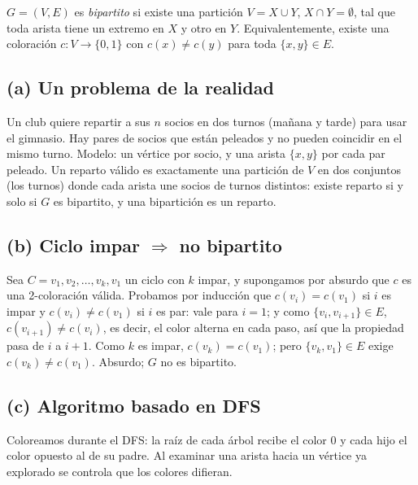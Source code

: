 \begin{definicion}
$G=(V,E)$ es \emph{bipartito} si existe una partición $V=X\cup Y$, $X\cap Y=\emptyset$, tal que toda
arista tiene un extremo en $X$ y otro en $Y$. Equivalentemente, existe una coloración $c:V\to\{0,1\}$
con $c(x)\neq c(y)$ para toda $\{x,y\}\in E$.
\end{definicion}

\subsection*{(a) Un problema de la realidad}
Un club quiere repartir a sus $n$ socios en dos turnos (mañana y tarde) para usar el gimnasio. Hay
pares de socios que están peleados y no pueden coincidir en el mismo turno. Modelo: un vértice por
socio, y una arista $\{x,y\}$ por cada par peleado. Un reparto válido es exactamente una partición de
$V$ en dos conjuntos (los turnos) donde cada arista une socios de turnos distintos: existe reparto
si y solo si $G$ es bipartito, y una bipartición es un reparto.

\subsection*{(b) Ciclo impar $\Rightarrow$ no bipartito}
Sea $C=v_1,v_2,\dots,v_k,v_1$ un ciclo con $k$ impar, y supongamos por absurdo que $c$ es una
2-coloración válida. Probamos por inducción que $c(v_i)=c(v_1)$ si $i$ es impar y $c(v_i)\ne c(v_1)$ si
$i$ es par: vale para $i=1$; y como $\{v_i,v_{i+1}\}\in E$, $c(v_{i+1})\ne c(v_i)$, es decir, el color
alterna en cada paso, así que la propiedad pasa de $i$ a $i+1$. Como $k$ es impar, $c(v_k)=c(v_1)$;
pero $\{v_k,v_1\}\in E$ exige $c(v_k)\neq c(v_1)$. Absurdo; $G$ no es bipartito.

\subsection*{(c) Algoritmo basado en DFS}
Coloreamos durante el DFS: la raíz de cada árbol recibe el color 0 y cada hijo el color opuesto al de
su padre. Al examinar una arista hacia un vértice ya explorado se controla que los colores difieran.

